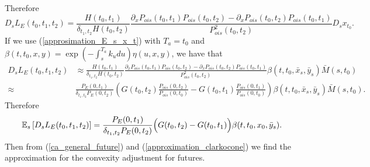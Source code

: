 \documentclass[a4paper,10pt]{article}
\newcommand{\1}{\mathbf{1}}
\begin{document}
Therefore
\begin{equation}\label{malliavin_derive_L}
D_s L_{E}(t_0,t_1,t_2) = \frac{H(t_0,t_1)}{\delta_{t_1,t_2}H(t_0,t_2)}\frac{\partial_{x}P_{ois}(t_0,t_1)P_{ois}(t_0,t_2) - \partial_{x}P_{ois}(t_0,t_2) P_{ois}(t_0,t_1) }{P^{2}_{ois}(t_0,t_2)} D_s x_{t_0}.
\end{equation}
If we use (\ref{approsimation_E_s_x_t}) with $T_a=t_0$ and $\beta(t,t_0,x,y) = \exp\left(-\int_{s}^{T_a}k_u du \right) \eta(u,x,y)$, we have that
\begin{align*}
D_s L_{E}(t_0,t_1,t_2) &\approx \frac{H(t_0,t_1)}{\delta_{t_1,t_2}H(t_0,t_2)}\frac{\partial_{x}P_{ois}(t_0,t_1)P_{ois}(t_0,t_2) - \partial_{x}P_{ois}(t_0,t_2) P_{ois}(t_0,t_1)}{P^{2}_{ois}(t_0,t_2)} \beta(t,t_0,\bar{x}_s,\bar{y}_s)\bar{M}(s,t_0) \nonumber \\
\approx& \frac{P_{E}(0,t_1)}{\delta_{t_1,t_2} P_{E}(0,t_2)} \left(G(t_0,t_2) \frac{P_{ois}(0,t_2)}{P_{ois}(0,t_0)} - G(t_0,t_1) \frac{P_{ois}(0,t_1)}{P_{ois}(0,t_0)} \right)\beta(t,t_0,\bar{x}_s,\bar{y}_s)\bar{M}(s,t_0).
\end{align*}
Therefore
\begin{equation}\label{approximation_clarkocone}
\mathbb{E}_s\left[ D_s L_{E}(t_0,t_1,t_2) \right] = \frac{P_{E}(0,t_1)}{\delta_{t_1,t_2} P_{E}(0,t_2)} \Bigl(G(t_0,t_2)  - G(t_0,t_1)\Bigr)\beta(t,t_0,x_0,\bar{y}_s).
\end{equation}
Then from (\ref{ca_general_future}) and (\ref{approximation_clarkocone}) we find the approximation for the convexity adjustment for futures.
\end{document}
